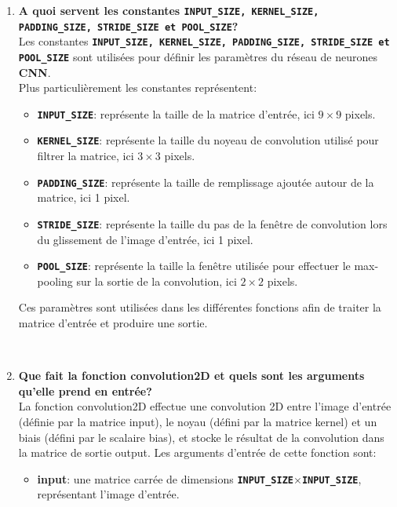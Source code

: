\documentclass[a4paper, 12pt, openany]{book}
\begin{document}
\begin{enumerate}
  \item {
    \textbf{A quoi servent les constantes \lstinline{INPUT_SIZE, KERNEL_SIZE, PADDING_SIZE, STRIDE_SIZE et POOL_SIZE}?} \vspace{0.2cm}\\
    Les constantes \textbf{\lstinline{INPUT_SIZE, KERNEL_SIZE, PADDING_SIZE, STRIDE_SIZE et POOL_SIZE}} sont utilisées pour définir les paramètres du réseau de neurones \textbf{CNN}. \\
    Plus particulièrement les constantes représentent:
    \begin{itemize}
      \item \textbf{\lstinline{INPUT_SIZE}}: représente la taille de la matrice d'entrée, ici $9 \times 9$ pixels.
      \item \textbf{\lstinline{KERNEL_SIZE}}: représente la taille du noyeau de convolution utilisé pour filtrer la matrice, ici $3 \times 3$ pixels.
      \item \textbf{\lstinline{PADDING_SIZE}}: représente la taille de remplissage ajoutée autour de la matrice, ici 1 pixel.
      \item \textbf{\lstinline{STRIDE_SIZE}}: représente la taille du pas de la fenêtre de convolution lors du glissement de l'image d'entrée, ici 1 pixel.
      \item \textbf{\lstinline{POOL_SIZE}}: représente la taille la fenêtre utilisée pour effectuer le max-pooling sur la sortie de la convolution, ici $2 \times 2$ pixels.
    \end{itemize}
    Ces paramètres sont utilisées dans les différentes fonctions afin de traiter la matrice d'entrée et produire une sortie.
  } \\
  \item {
    \textbf{Que fait la fonction convolution2D et quels sont les arguments qu'elle prend en entrée?} \vspace{0.2cm}\\ 
    La fonction convolution2D effectue une convolution 2D entre l'image d'entrée (définie par la matrice input), le noyau (défini par la matrice kernel) et un biais (défini par le scalaire bias), et stocke le résultat de la convolution dans la matrice de sortie output.
    Les arguments d'entrée de cette fonction sont:
    \begin{itemize}
      \item \textbf{input}: une matrice carrée de dimensions \textbf{\lstinline{INPUT_SIZE}}$\times$\textbf{\lstinline{INPUT_SIZE}}, représentant l'image d'entrée.

\end{itemize}}
\end{enumerate}
\end{document}
